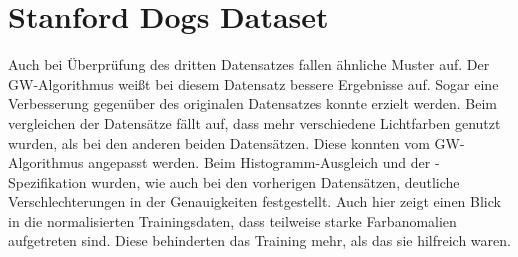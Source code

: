   \section{Stanford Dogs Dataset}
Auch bei Überprüfung des dritten Datensatzes fallen ähnliche Muster auf. Der GW-Algorithmus weißt bei diesem Datensatz bessere Ergebnisse auf. Sogar eine Verbesserung gegenüber des originalen Datensatzes konnte erzielt werden. Beim vergleichen der Datensätze fällt auf, dass mehr verschiedene Lichtfarben genutzt wurden, als bei den anderen beiden Datensätzen. Diese konnten vom GW-Algorithmus angepasst werden. Beim Histogramm-Ausgleich und der -Spezifikation wurden, wie auch bei den vorherigen Datensätzen, deutliche Verschlechterungen in der Genauigkeiten festgestellt. Auch hier zeigt einen Blick in die normalisierten Trainingsdaten, dass teilweise starke Farbanomalien aufgetreten sind. Diese behinderten das Training mehr, als das sie hilfreich waren.  
